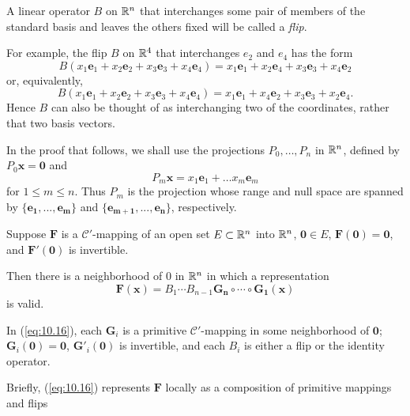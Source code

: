 \begin{mydef}
    \label{mydef:10.6}
    A linear operator $B$ on ${\protect\mathbb R}^n$ that interchanges some pair of members of the standard basis and leaves the others fixed will be called a \emph{flip}.

    For example, the flip $B$ on ${\protect\mathbb R}^4$ that interchanges $e_2$ and $e_4$ has the form
    \begin{equation}
        \label{eq:10.13}
        B(x_1 \mathbf{e}_1 + 
        x_2 \mathbf{e}_2 + 
        x_3 \mathbf{e}_3 + 
        x_4 \mathbf{e}_4) = 
        x_1 \mathbf{e}_1 + 
        x_2 \mathbf{e}_4 + 
        x_3 \mathbf{e}_3 + 
        x_4 \mathbf{e}_2
    \end{equation}
    or, equivalently,
    \begin{equation}
        \label{eq:10.14}
        B(x_1 \mathbf{e}_1 + 
        x_2 \mathbf{e}_2 + 
        x_3 \mathbf{e}_3 + 
        x_4 \mathbf{e}_4) = 
        x_1 \mathbf{e}_1 + 
        x_4 \mathbf{e}_2 +
        x_3 \mathbf{e}_3 + 
        x_2 \mathbf{e}_4 .
    \end{equation}
    Hence $B$ can also be thought of as interchanging two of the coordinates,
    rather that two basis vectors.

    In the proof that follows, we shall use the projections $P_0,\dots,P_n$ in ${\protect\mathbb R}^n$, defined by $P_0 \mathbf{x = 0}$ and 
    \begin{equation}
        \label{eq:10.15}
        P_m \mathbf{x} = 
        x_1 \mathbf{e}_1 + \dots 
        x_m \mathbf{e}_m 
    \end{equation}
    for $1 \leq m \leq n$.
    Thus $P_m$ is the projection whose range and null space are spanned by $\{\mathbf{e_1,...,e_m}\}$ and $\{\mathbf{e_{m+1},...,e_n}\}$,
    respectively.
\end{mydef}

\begin{thm}
    \label{thm:10.7}
    Suppose $\mathbf{F}$ is a $\mathscr{C}'$-mapping of an open set $E \subset {\protect\mathbb R}^n$ into ${\protect\mathbb R}^n$, $\mathbf{0} \in E$, $\mathbf{F(0) = 0}$, and $\mathbf{F'(0)}$ is invertible.
    
    Then there is a neighborhood of $0$ in ${\protect\mathbb R}^n$ in which a representation
    \begin{equation}
        \label{eq:10.16}
        \mathbf{F(x)} = B_1 \cdots B_{n-1} \mathbf{G_n \circ \cdots \circ G_1(x)}
    \end{equation}
    is valid.

    In (\ref{eq:10.16}), each $\mathbf{G}_i$ is a primitive $\mathscr{C}'$-mapping in some neighborhood of $\mathbf{0}$;
    $\mathbf{G}_i(\mathbf{0})=\mathbf{0}$, $\mathbf{G}'_i(\mathbf{0})$ is invertible, and each $B_i$ is either a flip or the identity operator.
\end{thm}

Briefly, (\ref{eq:10.16}) represents $\mathbf{F}$ locally as a composition of primitive mappings and flips



